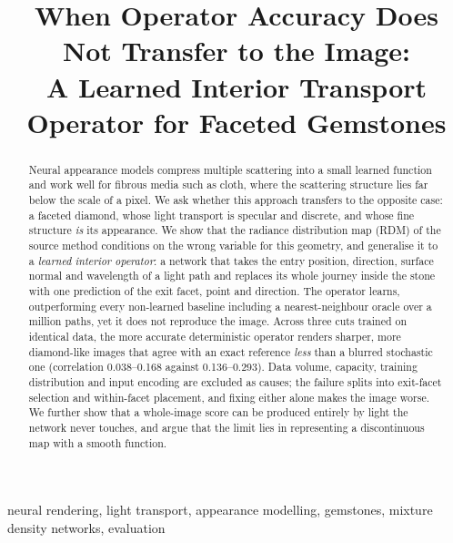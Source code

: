 \documentclass[conference]{IEEEtran}
\begin{document}
\title{When Operator Accuracy Does Not Transfer to the Image:\\
A Learned Interior Transport Operator for Faceted Gemstones}

\author{
}

\maketitle

\begin{abstract}
Neural appearance models compress multiple scattering into a small learned
function and work well for fibrous media such as cloth, where the scattering
structure lies far below the scale of a pixel. We ask whether this approach
transfers to the opposite case: a faceted diamond, whose light transport is
specular and discrete, and whose fine structure \emph{is} its appearance. We
show that the radiance distribution map (RDM) of the source method conditions on
the wrong variable for this geometry, and generalise it to a
\emph{learned interior operator}: a network that takes the entry position,
direction, surface normal and wavelength of a light path and replaces its whole
journey inside the stone with one prediction of the exit facet, point and
direction. The operator learns, outperforming every non-learned baseline
including a nearest-neighbour oracle over a million paths, yet it does not
reproduce the image. Across three cuts trained on identical data, the more
accurate deterministic operator renders sharper, more diamond-like images that
agree with an exact reference \emph{less} than a blurred stochastic one
(correlation 0.038--0.168 against 0.136--0.293). Data volume, capacity, training
distribution and input encoding are excluded as causes; the failure splits into
exit-facet selection and within-facet placement, and fixing either alone makes
the image worse. We further show that a whole-image score can be produced
entirely by light the network never touches, and argue that the limit lies in
representing a discontinuous map with a smooth function.
\end{abstract}

\begin{IEEEkeywords}
neural rendering, light transport, appearance modelling, gemstones, mixture density networks, evaluation
\end{IEEEkeywords}
\end{document}
